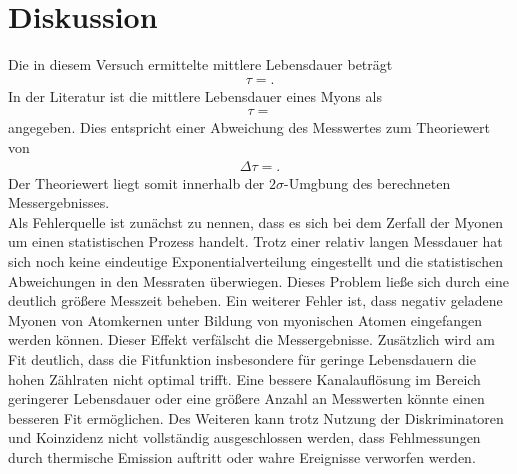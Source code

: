 \section{Diskussion}
\label{sec:Diskussion}

Die in diesem Versuch ermittelte mittlere Lebensdauer beträgt
\begin{align*}
  \tau = .
\end{align*}
In der Literatur \cite{Agashe:2014kda} ist die mittlere Lebensdauer eines Myons als
\begin{align*}
  \tau = 
\end{align*}
angegeben.
Dies entspricht einer Abweichung des Messwertes zum Theoriewert von
\begin{align*}
  \Delta \tau = .
\end{align*}
Der Theoriewert liegt somit innerhalb der $2\sigma$-Umgbung des berechneten Messergebnisses.\\
Als Fehlerquelle ist zunächst zu nennen, dass es sich bei dem Zerfall der Myonen um einen statistischen Prozess handelt.
Trotz einer relativ langen Messdauer hat sich noch keine eindeutige Exponentialverteilung eingestellt und die statistischen Abweichungen in den Messraten überwiegen.
Dieses Problem ließe sich durch eine deutlich größere Messzeit beheben.
Ein weiterer Fehler ist, dass negativ geladene Myonen von Atomkernen unter Bildung von myonischen Atomen eingefangen werden können.
Dieser Effekt verfälscht die Messergebnisse.
Zusätzlich wird am Fit deutlich, dass die Fitfunktion insbesondere für geringe Lebensdauern die hohen Zählraten nicht optimal trifft.
Eine bessere Kanalauflösung im Bereich geringerer Lebensdauer oder eine größere Anzahl an Messwerten könnte einen besseren Fit ermöglichen.
Des Weiteren kann trotz Nutzung der Diskriminatoren und Koinzidenz nicht vollständig ausgeschlossen werden, dass Fehlmessungen durch thermische Emission auftritt oder wahre Ereignisse verworfen werden.
